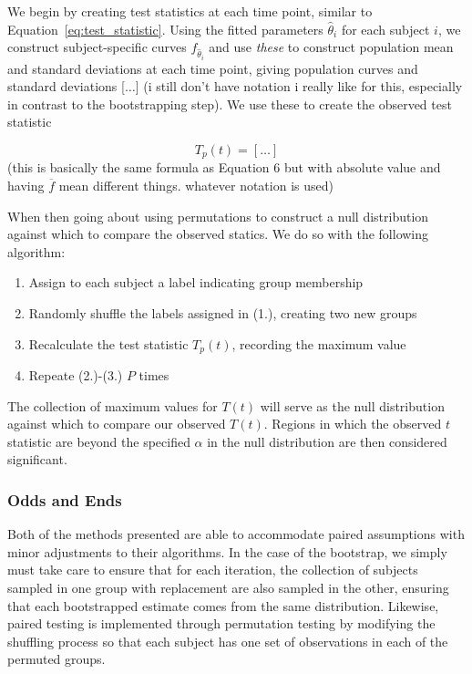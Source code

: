 \documentclass{article}
\begin{document}
We begin by creating test statistics at each time point, similar to Equation~\ref{eq:test_statistic}. Using the fitted parameters $\hat{\theta}_i$ for each subject $i$, we construct subject-specific curves $f_{\hat{\theta}_i}$ and use \textit{these} to construct population mean and standard deviations at each time point, giving population curves and standard deviations [$\dots$] (i still don't have notation i really like for this, especially in contrast to the bootstrapping step). We use these to create the observed test statistic

\begin{equation}
T_p(t) = [\dots] 
\end{equation}
(this is basically the same formula as Equation 6 but with absolute value and having $\overline{f}$ mean different things. whatever notation is used)

When then going about using permutations to construct a null distribution against which to compare the observed statics. We do so with the following algorithm:

\begin{enumerate}
\item Assign to each subject a label indicating group membership
\item Randomly shuffle the labels assigned in (1.), creating two new groups 
\item Recalculate the test statistic $T_p(t)$, recording the maximum value
\item Repeate (2.)-(3.) $P$ times
\end{enumerate}

The collection of maximum values for $T(t)$ will serve as the null distribution against which to compare our observed $T(t)$. Regions in which the observed $t$ statistic are beyond the specified $\alpha$ in the null distribution are then considered significant.

\subsubsection{Odds and Ends}

Both of the methods presented are able to accommodate paired assumptions with minor adjustments to their algorithms. In the case of the bootstrap, we simply must take care to ensure that for each iteration, the collection of subjects sampled in one group with replacement are also sampled in the other, ensuring that each bootstrapped estimate comes from the same distribution. Likewise, paired testing is implemented through permutation testing by modifying the shuffling process so that each subject has one set of observations in each of the permuted groups.
\end{document}
